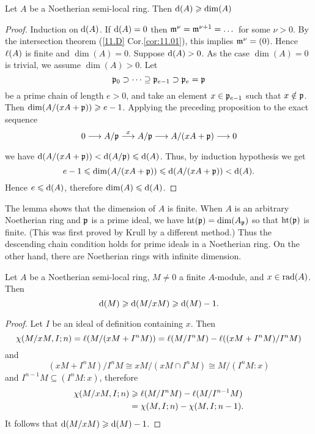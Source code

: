 \documentclass[../main]{subfiles}
\begin{document}
\begin{parlemma}\label{lem:12.01}
Let $A$ be a Noetherian semi-local ring. Then $\mathrm{d}(A) \geqslant \operatorname{dim}(A)$
\end{parlemma}

\begin{proof}
Induction on $\mathrm{d}(A)$. If $\mathrm{d}(A)=0$ then $\mathfrak{m}^\nu=\mathfrak{m}^{\nu+1}=\dots$ for some $\nu>0$. By the intersection theorem (\ref{11.D} Cor.\ref{cor:11.01}), this implies $\mathfrak{m}^\nu=(0)$. Hence $\ell(A)$ is finite and $\dim(A)=0$. Suppose $\mathrm{d}(A)>0$. As the case $\dim(A)=0$ is trivial, we assume $\dim(A)>0$. Let \[\mathfrak{p}_0\supset\cdots\supseteq\mathfrak{p}_{e-1} \supset \mathfrak{p}_e=\mathfrak{p}\] be a prime chain of length $e>0$, and take an element $x \in \mathfrak{p}_{e-1}$ such that $x \notin \mathfrak{p}$. Then $\operatorname{dim}(A /(xA+\mathfrak{p})) \geqslant e-1$. Applying the preceding proposition to the exact sequence \[0 \longrightarrow A / \ideal{p} \varrightarrow{x} A / \ideal{p} \longrightarrow A / (xA+\ideal{p}) \longrightarrow 0\] we have $\mathrm{d}(A / (xA+\mathfrak{p}))<\mathrm{d}(A / \mathfrak{p}) \leqslant \mathrm{d}(A)$. Thus, by induction hypothesis we get \[e-1 \leqslant \operatorname{dim}(A / (xA+\mathfrak{p})) \leqslant \mathrm{d}(A / (xA+\mathfrak{p}))<\mathrm{d}(A).\] Hence $e\leqslant \mathrm{d}(A)$, therefore $\operatorname{dim}(A)\leqslant\mathrm{d}(A)$.
\end{proof}

\begin{remark}
The lemma shows that the dimension of $A$ is finite. When $A$ is an arbitrary Noetherian ring and $\mathfrak{p}$ is a prime ideal, we have $\operatorname{ht}(\mathfrak{p})=\operatorname{dim}(A_{\mathfrak{p}})$ so that $\operatorname{ht}(\mathfrak{p})$ is finite. (This was first proved by Krull by a different method.) Thus the descending chain condition holds for prime ideals in a Noetherian ring. On the other hand, there are Noetherian rings with infinite dimension.
\end{remark} 

\begin{parlemma}\label{lem:12.02}
Let $A$ be a Noetherian semi-local ring, $M \neq 0$ a finite $A$-module, and $x \in\operatorname{rad} (A)$. Then \[\mathrm{d}(M) \geqslant\mathrm{d}(M / x M) \geqslant \mathrm{d}(M)-1.\]
\end{parlemma}

\begin{proof}
Let $I$ be an ideal of definition containing $x$. Then \[\chi(M/xM, I;n)=\ell(M/(xM+I^nM))=\ell(M/I^nM)-\ell((x M+I^n M) / I^n M)\] and \[(x M+I^n M) / I^n M \cong x M / (x M \cap I^n M) \cong M /(I^n M: x)\] and $I^{n-1} M \subseteq(I^n M: x)$, therefore
\begin{align*}
\chi(M/xM,I;n)&\geqslant\ell(M/I^nM)-\ell(M/I^{n-1}M)\\
&=\chi(M, I ; n)-\chi(M, I ; n-1).
\end{align*}
It follows that $\mathrm{d}(M / x M) \geqslant \mathrm{d}(M)-1$.
\end{proof}
\end{document}

